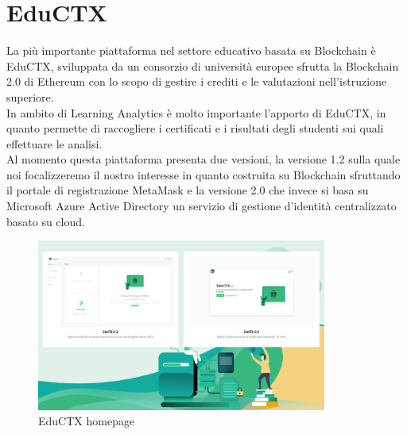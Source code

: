 \section{EduCTX}
La più importante piattaforma nel settore educativo basata su Blockchain è EduCTX, sviluppata da un consorzio di università europee sfrutta la Blockchain 2.0 di Ethereum con lo scopo di gestire i crediti e le valutazioni nell'istruzione superiore.
\\In ambito di Learning Analytics è molto importante l'apporto di EduCTX, in quanto permette di raccogliere i certificati e i risultati degli studenti sui quali effettuare le analisi.
\\Al momento questa piattaforma presenta due versioni, la versione 1.2 sulla quale noi focalizzeremo il nostro interesse in quanto costruita su Blockchain
sfruttando il portale di registrazione MetaMask e la versione 2.0 che invece si basa su Microsoft Azure Active Directory un servizio di gestione d'identità centralizzato basato su cloud.
\begin{figure}[h]
    \centering
    \includegraphics[width=0.85\textwidth]{Immagini/EduCTX.PNG}
    \caption{EduCTX homepage}
\end{figure}

